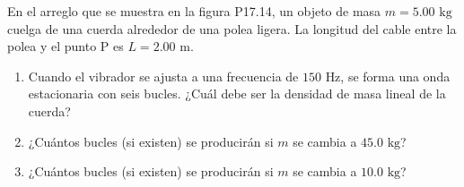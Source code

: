 \item En el arreglo que se muestra en la figura P17.14, un objeto de masa $m = 5.00\text{ kg}$ cuelga de una cuerda alrededor de una polea ligera. La longitud del cable entre la polea y el punto P es $L = 2.00\text{ m}$.
\begin{enumerate}
    \item Cuando el vibrador se ajusta a una frecuencia de $150\text{ Hz}$, se forma una onda estacionaria con seis bucles. ¿Cuál debe ser la densidad de masa lineal de la cuerda?
    \item ¿Cuántos bucles (si existen) se producirán si $m$ se cambia a $45.0\text{ kg}$?
    \item ¿Cuántos bucles (si existen) se producirán si $m$ se cambia a $10.0\text{ kg}$?
\end{enumerate}